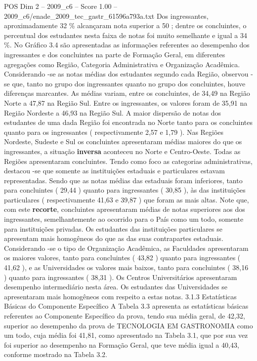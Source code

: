 \begin{textsample}{POS Dim 2 – 2009\_c6 – Score 1.00 – 2009\_c6/enade\_2009\_tec\_gastr\_61596a793a.txt}
Dos ingressantes, aproximadamente 32 \% alcançaram nota superior a 50 ; dentre os concluintes, o percentual dos estudantes nesta faixa de notas foi muito semelhante e igual a 34 \%.
No Gráfico 3.4 são apresentadas as informações referentes ao desempenho dos ingressantes e dos concluintes na parte de Formação Geral, em diferentes agregações como Região, Categoria Administrativa e Organização Acadêmica.
Considerando -se as notas médias dos estudantes segundo cada Região, observou -se que, tanto no grupo dos ingressantes quanto no grupo dos concluintes, houve diferenças marcantes.
As médias variam, entre os concluintes, de 34,49 na Região Norte a 47,87 na Região Sul.
Entre os ingressantes, os valores foram de 35,91 na Região Nordeste a 46,93 na Região Sul.
A maior dispersão de notas dos estudantes de uma dada Região foi encontrada no Norte tanto para os concluintes quanto para os ingressantes ( respectivamente 2,57 e 1,79 ).
Nas Regiões Nordeste, Sudeste e Sul os concluintes apresentaram médias maiores do que os ingressantes, a situação \textbf{inversa} aconteceu no Norte e Centro-Oeste.
Todas as Regiões apresentaram concluintes.
Tendo como foco as categorias administrativas, destacou -se que somente as instituições estaduais e particulares estavam representadas.
Sendo que as notas médias das estaduais foram inferiores, tanto para concluintes ( 29,44 ) quanto para ingressantes ( 30,85 ), às das instituições particulares ( respectivamente 41,63 e 39,87 ) que foram as mais altas.
Note que, com este \textbf{recorte}, concluintes apresentaram médias de notas superiores aos dos ingressantes, semelhantemente ao ocorrido para o País como um todo, somente para instituições privadas.
Os estudantes das instituições particulares se apresentam mais homogêneos do que as das suas contrapartes estaduais.
Considerando -se o tipo de Organização Acadêmica, as Faculdades apresentaram os maiores valores, tanto para concluintes ( 43,82 ) quanto para ingressantes ( 41,62 ), e as Universidades os valores mais baixos, tanto para concluintes ( 38,16 ) quanto para ingressantes ( 38,31 ).
Os Centros Universitários apresentaram desempenho intermediário nesta área.
Os estudantes das Universidades se apresentaram mais homogêneos com respeito a estas notas. 3.1.3 Estatísticas Básicas do Componente Específico A Tabela 3.3 apresenta as estatísticas básicas referentes ao Componente Específico da prova, tendo sua média geral, de 42,32, superior ao desempenho da prova de TECNOLOGIA EM GASTRONOMIA como um todo, cuja média foi 41,81, como apresentado na Tabela 3.1, que por sua vez foi superior ao desempenho na Formação Geral, que teve média igual a 40,43, conforme mostrado na Tabela 3.2.

\end{textsample}
